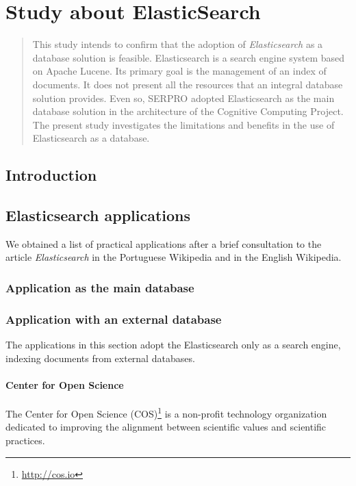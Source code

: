\chapter{Study about ElasticSearch}
\label{chap:elasticsearch}

\begin{abstract}
	This study intends to confirm that the adoption of \textit{Elasticsearch} as a database solution is feasible. Elasticsearch is a search engine system based on Apache Lucene. Its primary goal is the management of an index of documents. It does not present all the resources that an integral database solution provides. Even so, SERPRO adopted Elasticsearch as the main database solution in the architecture of the Cognitive Computing Project. The present study investigates the limitations and benefits in the use of Elasticsearch as a database.
\end{abstract}

\section{Introduction}
\label{sec:intro}

\section{Elasticsearch applications}
\label{sec:applications}
We obtained a list of practical applications after a brief consultation to the article \textit{Elasticsearch} in the Portuguese Wikipedia\cite{wiki:pt:elasticsearch} and in the English Wikipedia\cite{wiki:en:elasticsearch}.

\subsection*{Application as the main database}
\label{sec:appmaindb}

\subsection*{Application with an external database}
\label{sec:appexternaldb}
The applications in this section adopt the Elasticsearch only as a search engine, indexing documents from external databases.

\subsubsection*{Center for Open Science}
\label{sec:cos}
The Center for Open Science  (COS)\footnote{\url{http://cos.io}} is a non-profit technology organization dedicated to improving the alignment between scientific values and scientific practices\cite{elasticsearch:cos}.


